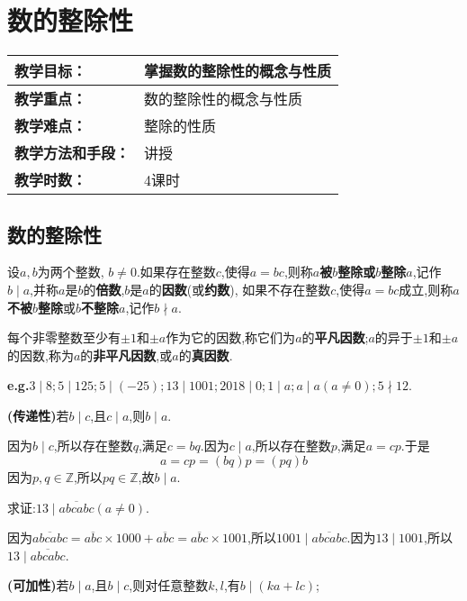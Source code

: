 \section{数的整除性}
\begin{table}[htb]
	\centering  
	\begin{tabular}{p{32mm}|p{95.6mm}}
		\hline 
		\textbf{教学目标：}       & 掌握数的整除性的概念与性质  \\ \hline
		\textbf{教学重点：}       & 数的整除性的概念与性质 \\ \hline
		\textbf{教学难点：}       & 整除的性质\\ \hline
		\textbf{教学方法和手段：} & 讲授  \\ \hline
		\textbf{教学时数：}       & 4课时 \\ \hline
	\end{tabular}
\end{table}
\subsection{数的整除性}
 设$a, b$为两个整数, $b \neq 0$.如果存在整数$c$,使得$a=b c$,则称\textbf{$a$被$b$整除或$b$整除$a$},记作$b \mid a$,并称$a$是$b$的\textbf{倍数},$b$是$a$的\textbf{因数}(或\textbf{约数}), 如果不存在整数$c$,使得$a=bc$成立,则称\textbf{$a$不被$b$整除}或\textbf{$b$不整除$a$},记作$b\nmid a$.

\entry 每个非零整数至少有$\pm1$和$\pm a$作为它的因数,称它们为$a$的\textbf{平凡因数};$a$的异于$\pm1$和$\pm a$的因数,称为$a$的\textbf{非平凡因数},或$a$的\textbf{真因数}.

\entry \textbf{e.g.}$3\mid 8;5\mid 125;5\mid(-25);13\mid 1001;2018\mid 0;1\mid a;a\mid a(a\neq0);5\nmid 12$.

\property \textbf{(传递性)}若$b \mid c$,且$c \mid a$,则$b\mid a$.

\proof 因为$b \mid c$,所以存在整数$q$,满足$c=bq$.因为$c \mid a$,所以存在整数$p$,满足$a=cp$.于是
\begin{equation*}
	a=cp=(bq)p=(pq)b
\end{equation*}
因为$p,q\in\mathbb{Z}$,所以$pq\in\mathbb{Z}$,故$b\mid a$.

\example 求证:$13\mid\overline{abcabc}(a\neq 0)$.

\proof 因为$\overline{abcabc}=\overline{abc}\times1000+\overline{abc}=\overline{abc}\times1001$,所以$1001\mid \overline{abcabc}$.因为$13\mid 1001$,所以$13\mid\overline{abcabc}$.

\property \textbf{(可加性)}若$b\mid a$,且$b\mid c$,则对任意整数$k,l$,有$b\mid (ka+lc)$;


